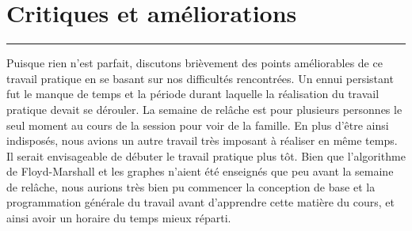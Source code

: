 \documentclass[10pt,letterpaper]{article}
\begin{document}
\newpage
\section{Critiques et améliorations}
\hrule
\vspace{1em}
Puisque rien n'est parfait, discutons brièvement des points améliorables de ce travail pratique en se basant sur nos difficultés rencontrées. 
Un ennui persistant fut le manque de temps et la période durant laquelle la réalisation du travail pratique devait se dérouler. 
La semaine de relâche est pour plusieurs personnes le seul moment au cours de la session pour voir de la famille. 
En plus d’être ainsi indisposés, nous avions un autre travail très imposant à réaliser en même temps. 
Il serait envisageable de débuter le travail pratique plus tôt. 
Bien que l’algorithme de Floyd-Marshall et les graphes n’aient été enseignés que peu avant la semaine de relâche, 
nous aurions très bien pu commencer la conception de base et la programmation générale du travail avant d’apprendre cette matière du cours, 
et ainsi avoir un horaire du temps mieux réparti.
\end{document}
